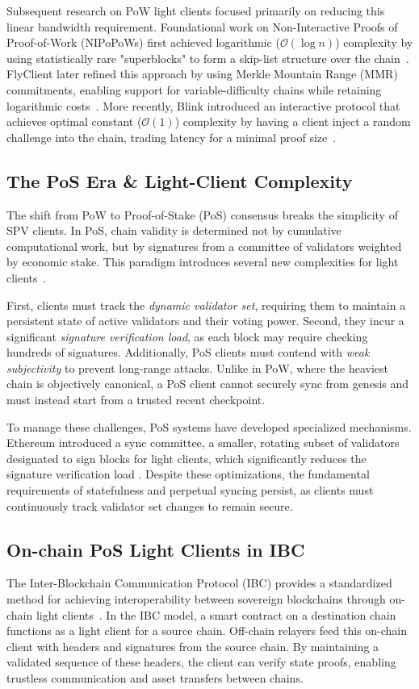 \documentclass[runningheads]{llncs}
\begin{document}
Subsequent research on PoW light clients focused primarily on reducing this linear bandwidth requirement. Foundational work on Non-Interactive Proofs of Proof-of-Work (NIPoPoWs) first achieved logarithmic ($\mathcal{O}(\log n)$) complexity by using statistically rare "superblocks" to form a skip-list structure over the chain~\cite{Kiayias2020Nipopow}. FlyClient later refined this approach by using Merkle Mountain Range (MMR) commitments, enabling support for variable-difficulty chains while retaining logarithmic costs~\cite{Bunz2020FlyClient}. More recently, Blink introduced an interactive protocol that achieves optimal constant ($\mathcal{O}(1)$) complexity by having a client inject a random challenge into the chain, trading latency for a minimal proof size~\cite{Aumayr2024Blink}.


\subsection{The PoS Era \& Light-Client Complexity}
The shift from PoW to Proof-of-Stake (PoS) consensus breaks the simplicity of SPV clients. In PoS, chain validity is determined not by cumulative computational work, but by signatures from a committee of validators weighted by economic stake. This paradigm introduces several new complexities for light clients~\cite{Chatzigiannis2021SoK}.

First, clients must track the \textit{dynamic validator set}, requiring them to maintain a persistent state of active validators and their voting power. Second, they incur a significant \textit{signature verification load}, as each block may require checking hundreds of signatures. Additionally, PoS clients must contend with \textit{weak subjectivity} to prevent long-range attacks. Unlike in PoW, where the heaviest chain is objectively canonical, a PoS client cannot securely sync from genesis and must instead start from a trusted recent checkpoint.

To manage these challenges, PoS systems have developed specialized mechanisms. Ethereum introduced a sync committee, a smaller, rotating subset of validators designated to sign blocks for light clients, which significantly reduces the signature verification load \cite{Ethereum2025ConsensusSpecs}. Despite these optimizations, the fundamental requirements of statefulness and perpetual syncing persist, as clients must continuously track validator set changes to remain secure.

\subsection{On-chain PoS Light Clients in IBC}
The Inter-Blockchain Communication Protocol (IBC) provides a standardized method for achieving interoperability between sovereign blockchains through on-chain light clients~\cite{Goes2020IBC}. In the IBC model, a smart contract on a destination chain functions as a light client for a source chain. Off-chain relayers feed this on-chain client with headers and signatures from the source chain. By maintaining a validated sequence of these headers, the client can verify state proofs, enabling trustless communication and asset transfers between chains.
\end{document}

